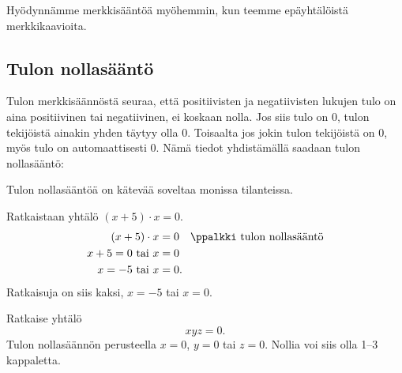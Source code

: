 Hyödynnämme merkkisääntöä myöhemmin, kun teemme epäyhtälöistä merkkikaavioita.

\subsection*{Tulon nollasääntö}

Tulon merkkisäännöstä seuraa, että positiivisten ja negatiivisten lukujen tulo on aina positiivinen tai negatiivinen, ei koskaan nolla.
Jos siis tulo on $0$, tulon tekijöistä ainakin yhden täytyy olla $0$.
Toisaalta jos jokin tulon tekijöistä on $0$, myös tulo on automaattisesti $0$.
Nämä tiedot yhdistämällä saadaan tulon nollasääntö:



Tulon nollasääntöä on kätevää soveltaa monissa tilanteissa.

\begin{esimerkki} Ratkaistaan yhtälö $(x+5) \cdot x =0 $.
    \begin{align*}
        (x+5)\cdot x &=0 \quad \ppalkki \text{ tulon nollasääntö} \\
        x +5= 0 \text{ tai } x &=0 \\
        x= -5 \text{ tai } x &=0.
    \end{align*}
    Ratkaisuja on siis kaksi, $x= -5$ tai $x= 0$.
\end{esimerkki}



\begin{esimerkki} Ratkaise yhtälö
    \[xyz=0.\]
Tulon nollasäännön perusteella $x=0$, $y=0$ tai $z=0$. Nollia voi siis
olla 1--3 kappaletta.
\end{esimerkki}

